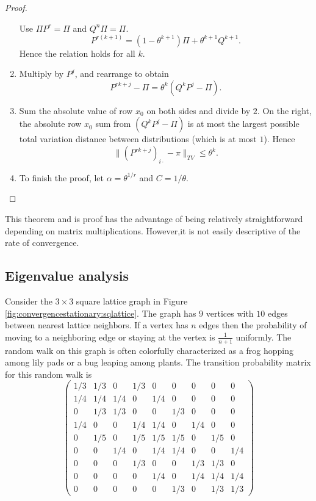 \documentclass[12pt]{article}
\begin{document}
\begin{proof}
\begin{enumerate}
            Use \( \Pi P^r = \Pi \) and \( Q^n \Pi = \Pi \).
            \[
                P^{r(k+1)} = (1- \theta^{k+1})\Pi + \theta^{k+1} Q^{k+1}.
            \] Hence the relation holds for all \( k \).
        \item
            Multiply by \( P^j \), and rearrange to obtain
            \[
                P^{rk+j} - \Pi = \theta^k (Q^k P^j - \Pi).
            \]
        \item
            Sum the absolute value of row \( x_0 \) on both sides and
            divide by \( 2 \).  On the right, the absolute row \( x_0 \)
            sum from \( (Q^k P^j - \Pi) \) is at most the largest
            possible total variation distance between distributions (which
            is at most \( 1 \)).  Hence
            \[
                \| (P^{rk+j})_{i \cdot} - \pi \|_{TV} \le \theta^k.
            \]
        \item
            To finish the proof, let \( \alpha = \theta^{1/r} \) and \(
            C= 1/\theta \).
    \end{enumerate}
\end{proof}

This theorem and is proof has the advantage of being relatively
straightforward depending on matrix multiplications.  However,it is not
easily descriptive of the rate of convergence.

\subsection*{Eigenvalue analysis}

Consider the \( 3 \times 3 \) square lattice graph in Figure~%
\ref{fig:convergencestationary:sqlattice}.  The graph has \( 9 \)
vertices with \( 10 \) edges between nearest lattice neighbors.  If a
vertex has \( n \) edges then the probability of moving to a neighboring
edge or staying at the vertex is \( \frac{1}{n+1} \) uniformly. The
random walk on this graph is often colorfully characterized as a frog
hopping among lily pads or a bug leaping among plants.  The transition
probability matrix for this random walk is
\[
    \begin{pmatrix}
        1/3 & 1/3 & 0 & 1/3 & 0 & 0 & 0 & 0 & 0 \\
        1/4 & 1/4 & 1/4 & 0 & 1/4 & 0 & 0 & 0 & 0 \\
        0 & 1/3 & 1/3 & 0 & 0 & 1/3 & 0 & 0 & 0 \\
        1/4 & 0 & 0 & 1/4 & 1/4 & 0 & 1/4 & 0 & 0 \\
        0 & 1/5 & 0 & 1/5 & 1/5 & 1/5 & 0 & 1/5 & 0 \\
        0 & 0 & 1/4 & 0 & 1/4 & 1/4 & 0 & 0 & 1/4 \\
        0 & 0 & 0 & 1/3 & 0 & 0 & 1/3 & 1/3 & 0 \\
        0 & 0 & 0 & 0 & 1/4 & 0 & 1/4 & 1/4 & 1/4 \\
        0 & 0 & 0 & 0 & 0 & 1/3 & 0 & 1/3 & 1/3
    \end{pmatrix}
\]
\end{document}
